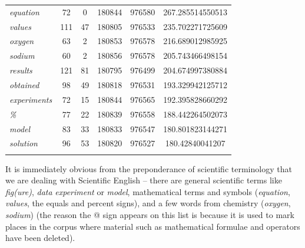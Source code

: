 \begin{table}
{\begin{tabular}[t]{l *{2}{S[table-format=4]} *{2}{S[table-format=8]} S}
\textit{equation} & 72 & 0 & 180844 & 976580 & 267.285514550513 \\
\textit{values} & 111 & 47 & 180805 & 976533 & 235.702271725609 \\
\textit{oxygen} & 63 & 2 & 180853 & 976578 & 216.689012985925 \\
\textit{sodium} & 60 & 2 & 180856 & 976578 & 205.743466498154 \\
\textit{results} & 121 & 81 & 180795 & 976499 & 204.674997380884 \\
\textit{obtained} & 98 & 49 & 180818 & 976531 & 193.329942125712 \\
\textit{experiments} & 72 & 15 & 180844 & 976565 & 192.395828660292 \\
\textit{\%} & 77 & 22 & 180839 & 976558 & 188.442264502073 \\
\textit{model} & 83 & 33 & 180833 & 976547 & 180.801823144271 \\
\textit{solution} & 96 & 53 & 180820 & 976527 & 180.42840041207 \\
\lspbottomrule
\end{tabular}}
\end{table}

It is immediately obvious from the preponderance of scientific terminology that we are dealing with Scientific English -- there are general scientific terms like \textit{fig(ure)}, \textit{data} \textit{experiment} or \textit{model}, mathematical terms and symbols (\textit{equation}, \textit{values}, the equals and percent signs), and a few words from chemistry (\textit{oxygen}, \textit{sodium}) (the reason the @ sign appears on this list is because it is used to mark places in the corpus where material such as mathematical formulae and operators have been deleted).

